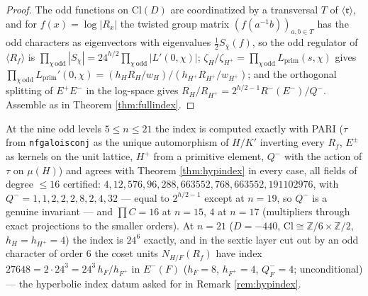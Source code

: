 \documentclass[11pt]{amsart}
\numberwithin{equation}{section}
\theoremstyle{plain}
\theoremstyle{definition}
\theoremstyle{remark}
\newcommand{\Z}{\mathbb{Z}}
\newcommand{\Cl}{\mathrm{Cl}}
\newcommand{\idealr}{\mathfrak{r}}
\newcommand{\Lprim}{L_{\mathrm{prim}}}
\begin{document}
\begin{proof}
The odd functions on $\Cl(D)$ are coordinatized by a transversal $T$ of
$\langle\idealr\rangle$, and for $f(x) = \log|R_x|$ the twisted group matrix
$(f(a^{-1}b))_{a,b\in T}$ has the odd characters as eigenvectors with
eigenvalues $\tfrac12S_{\bar\chi}(f)$, so the odd regulator of
$\langle R_f\rangle$ is $\prod_{\chi\,\mathrm{odd}}|S_\chi| =
24^{h/2}\prod_{\chi\,\mathrm{odd}}|L'(0,\chi)|$; $\zeta_H/\zeta_{H^+} =
\prod_{\chi\,\mathrm{odd}}\Lprim(s,\chi)$ gives
$\prod_{\chi\,\mathrm{odd}}\Lprim'(0,\chi) = (h_HR_H/w_H)/(h_{H^+}R_{H^+}/w_{H^+})$;
and the orthogonal splitting of $E^+E^-$ in the log-space gives
$R_H/R_{H^+} = 2^{h/2-1}R^-(E^-)/Q^-$.  Assemble as in Theorem
\ref{thm:fullindex}.
\end{proof}

At the nine odd levels $5 \le n \le 21$ the index is computed exactly with
PARI ($\tau$ from \texttt{nfgaloisconj} as the unique automorphism of $H/K'$
inverting every $R_f$, $E^\pm$ as kernels on the unit lattice, $H^+$ from a
primitive element, $Q^-$ with the action of $\tau$ on $\mu(H)$) and agrees
with Theorem \ref{thm:hypindex} in every case, all fields of degree $\le 16$
certified: $4, 12, 576, 96, 288, 663552, 768, 663552, 191102976$, with
$Q^- = 1, 1, 2, 2, 2, 8, 2, 4, 32$ --- equal to $2^{h/2-1}$ except at $n = 19$,
so $Q^-$ is a genuine invariant --- and $\prod C = 16$ at $n = 15$, $4$ at
$n = 17$ (multipliers through exact projections to the smaller orders).
At $n = 21$ ($D = -440$, $\Cl \cong \Z/6\times\Z/2$, $h_H = h_{H^+} = 4$) the
index is $24^6$ exactly, and in the sextic layer cut out by an odd
character of order $6$ the coset units $N_{H/F}(R_f)$ have index
$27648 = 2\cdot24^3 = 24^3\,h_F/h_{F^+}$ in $E^-(F)$ ($h_F = 8$, $h_{F^+} = 4$,
$Q^-_F = 4$; unconditional) --- the hyperbolic index datum asked for in
Remark \ref{rem:hypindex}.
\end{document}
